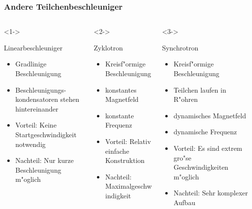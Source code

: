 \documentclass{beamer}
\begin{document}
\begin{frame}
\frametitle{Andere Teilchenbeschleuniger}
\begin{columns}
  \begin{column}{0.33\textwidth}<1->
    \begin{block}{Linearbeschleuniger}
      \begin{itemize}
        \item Gradlinige Beschleunigung
        \item Beschleunigungs-kondensatoren stehen hintereinander
        \item Vorteil: Keine Startgeschwindigkeit notwendig
        \item Nachteil: Nur kurze Beschleunigung m"oglich
      \end{itemize}
    \end{block}
  \end{column}
  \begin{column}{0.33\textwidth}<2->
    \begin{block}{Zyklotron}
      \begin{itemize}
        \item Kreisf"ormige Beschleunigung
        \item konstantes Magnetfeld
        \item konstante Frequenz
        \item Vorteil: Relativ einfache Konstruktion
        \item Nachteil: Maximalgeschwindigkeit
      \end{itemize}
    \end{block}
  \end{column}
  \begin{column}{0.33\textwidth}<3->
    \begin{block}{Synchrotron}
      \begin{itemize}
        \item Kreisf"ormige Beschleunigung
        \item Teilchen laufen in R"ohren
        \item dynamisches Magnetfeld
        \item dynamische Frequenz
        \item Vorteil: Es sind extrem gro"se Geschwindigkeiten m"oglich
        \item Nachteil: Sehr komplexer Aufbau
      \end{itemize}
    \end{block}
  \end{column}
\end{columns}
\end{frame}
\end{document}
